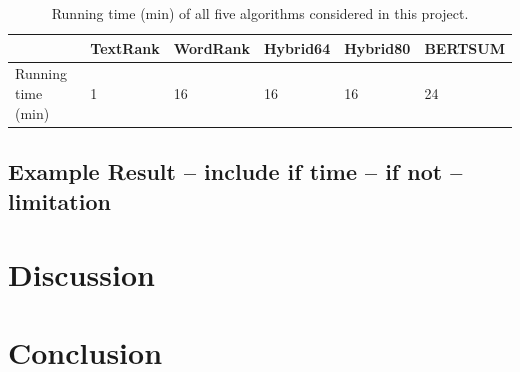 \documentclass[11pt]{article}
\begin{document}
\begin{table}[!h]
\centering
\begin{tabular}{l|lllll}
\hline
&\textbf{TextRank} & \textbf{WordRank} & \textbf{Hybrid64} & \textbf{Hybrid80} & \textbf{BERTSUM}\\
\hline
Running time (min) & 1 & 16 & 16 & 16 & 24\\
\hline
\end{tabular}
\caption{\label{tab:time}
Running time (min) of all five algorithms considered in this project.
}
\end{table}

\subsection{Example Result -- include if time -- if not -- limitation}

\section{Discussion}

\section{Conclusion}





\end{document}
